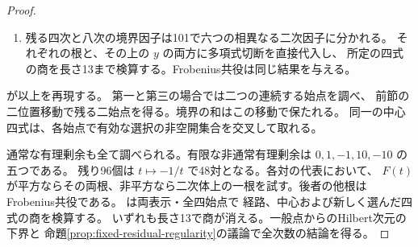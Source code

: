 \begin{proof}
\begin{enumerate}
\item 残る四次と八次の境界因子は101で六つの相異なる二次因子に分かれる。
それぞれの根と、その上の $y$ の両方に多項式切断を直接代入し、
所定の四式の商を長さ13まで検算する。Frobenius共役は同じ結果を与える。
\end{enumerate}
 が以上を再現する。
第一と第三の場合では二つの連続する始点を調べ、
前節の二位置移動で残る二始点を得る。境界の和はこの移動で保たれる。
同一の中心四式は、各始点で有効な選択の非空開集合を交叉して取れる。

通常な有理剰余も全て調べられる。有限な非通常有理剰余は $0,1,-1,10,-10$ の五つである。
残り96個は $t\mapsto-1/t$ で48対となる。各対の代表において、
$F(t)$ が平方ならその両根、非平方なら二次体上の一根を試す。後者の他根はFrobenius共役である。
 は両表示・全四始点で
経路、中心および新しく選んだ四式の商を検算する。
いずれも長さ13で商が消える。一般点からのHilbert次元の下界と
命題\ref{prop:fixed-residual-regularity}の議論で全次数の結論を得る。
\end{proof}
